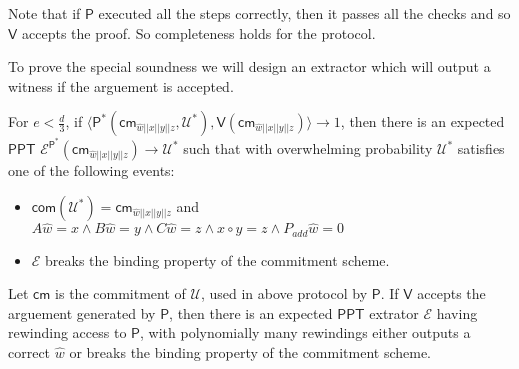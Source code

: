 \documentclass[runningheads]{llncs}
\newcommand{\innp}[2]{\langle #1,#2\rangle}
\def\ppt{\mathsf{PPT}}
\def\extrac{\mathcal{E}} %
\def\prover{\mathsf{P}}
\def\verifier{\mathsf{V}}
\def\cm{\mathsf{cm}} %
\def\com{\mathsf{com}} %
\def\extwit{\hat{w}} %
\def\calU{\mathcal{U}}
\begin{document}
	Note that if $\prover$ executed all the steps correctly, then it passes all the checks and so $\verifier$ accepts the proof. So completeness holds for the protocol.
	
	To prove the special soundness we will design an extractor which will output a witness if the arguement is accepted.
	
	\begin{theorem}
		For $e < \frac{d}{3}$, if $\innp{\prover^*(\cm_{\extwit||x||y||z}, \calU^*)}{\verifier(\cm_{\extwit||x||y||z})} \rightarrow 1$, then there is an expected $\ppt$ $\extrac^{\prover^*}(\cm_{\extwit||x||y||z}) \rightarrow \calU^*$ such that with overwhelming probability $\calU^*$ satisfies one of the following events:
		\begin{itemize}
			\item $\com(\calU^*)=\cm_{\extwit||x||y||z}$ and $A\extwit = x \wedge B \extwit = y \wedge C \extwit = z \wedge x\circ y =z \wedge P_{add} \extwit = 0$
			\item $\extrac$ breaks the binding property of the commitment scheme.
			
		\end{itemize}
		Let $\cm$ is the commitment of $\calU$, used in above protocol by $\prover$. If $\verifier$ accepts the arguement generated by $\prover$, then there is an expected $\ppt$ extrator $\extrac$ having rewinding access to $\prover$, with polynomially many rewindings either outputs a correct $\extwit$ or breaks the binding property of the commitment scheme.
	\end{theorem}
\end{document}
